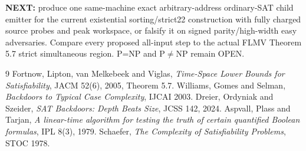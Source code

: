 \documentclass[11pt]{article}
\begin{document}
\textbf{NEXT:} produce one same-machine exact arbitrary-address ordinary-SAT child emitter for the current existential sorting/strict22 construction with fully charged source probes and peak workspace, or falsify it on signed parity/high-width easy adversaries. Compare every proposed all-input step to the actual FLMV Theorem 5.7 strict simultaneous region. P=NP and P$\ne$NP remain OPEN.

\begin{thebibliography}{9}
 Fortnow, Lipton, van Melkebeek and Viglas, \emph{Time-Space Lower Bounds for Satisfiability}, JACM 52(6), 2005, Theorem 5.7.
 Williams, Gomes and Selman, \emph{Backdoors to Typical Case Complexity}, IJCAI 2003.
 Dreier, Ordyniak and Szeider, \emph{SAT Backdoors: Depth Beats Size}, JCSS 142, 2024.
 Aspvall, Plass and Tarjan, \emph{A linear-time algorithm for testing the truth of certain quantified Boolean formulas}, IPL 8(3), 1979.
 Schaefer, \emph{The Complexity of Satisfiability Problems}, STOC 1978.
\end{thebibliography}
\end{document}
